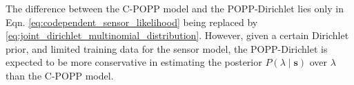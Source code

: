 
The difference between the C-POPP model and the POPP-Dirichlet lies only in Eqn. \ref{eq:codependent_sensor_likelihood} being replaced by \ref{eq:joint_dirichlet_multinomial_distribution}. However, given a certain Dirichlet prior, and limited training data for the sensor model, the POPP-Dirichlet is expected to be more conservative in estimating the posterior $P(\lambda \mid \mathbf{s})$ over $\lambda$ than the C-POPP model.

